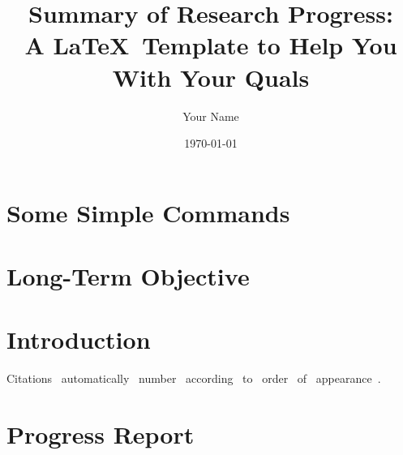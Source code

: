 \documentclass{report}
\title{Summary of Research Progress:\\A \LaTeX\ Template to Help You With Your Quals}
\author{Your Name}
\date{\today}
\begin{document}
\maketitle


\thispagestyle{fancy}


\section{Some Simple Commands}



\section{Long-Term Objective}
\label{sec:objective}


\section{Introduction}
\label{sec:introduction}
Citations~\cite{youssef_scalable_2021} automatically~\cite{sood_coupling_2022} number~\cite{schuette_decorrelating_2023} according~\cite{schuette_applying_2020} to~\cite{youssef_scalable_2023} order~\cite{schuette_efficient_2023} of~\cite{zhang_topology_2015} appearance~\cite{zhang_shape_2016}.




\section{Progress Report}
\label{sec:progress_report}

\end{document}
